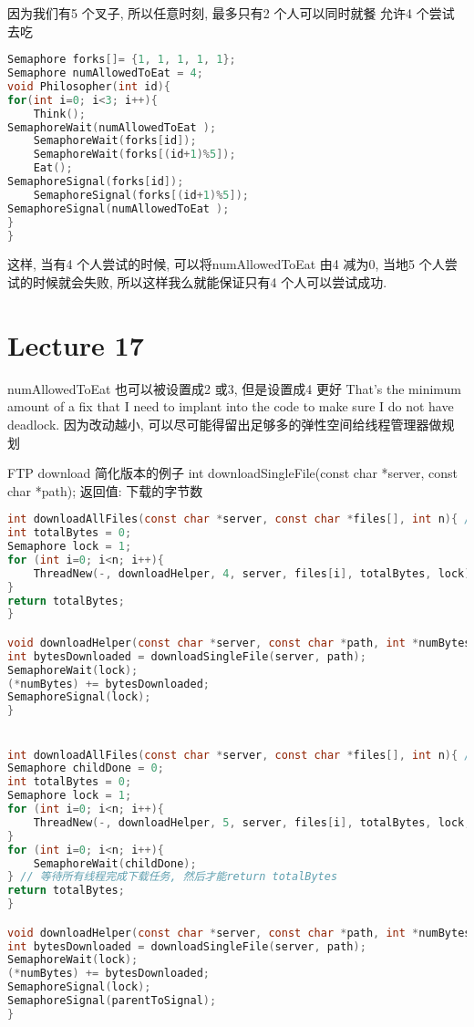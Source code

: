 \documentclass{article}
\begin{document}
因为我们有5 个叉子, 所以任意时刻, 最多只有2 个人可以同时就餐
允许4 个尝试去吃
\begin{lstlisting}[language = C]
Semaphore forks[]= {1, 1, 1, 1, 1};
Semaphore numAllowedToEat = 4;
void Philosopher(int id){
for(int i=0; i<3; i++){
	Think();
SemaphoreWait(numAllowedToEat );
	SemaphoreWait(forks[id]);
	SemaphoreWait(forks[(id+1)%5]);
	Eat();
SemaphoreSignal(forks[id]);
	SemaphoreSignal(forks[(id+1)%5]);
SemaphoreSignal(numAllowedToEat );
}
}
\end{lstlisting}
这样, 当有4 个人尝试的时候, 可以将numAllowedToEat 由4 减为0, 当地5 个人尝试的时候就会失败, 所以这样我么就能保证只有4 个人可以尝试成功.

\section{Lecture 17}
numAllowedToEat 也可以被设置成2 或3, 但是设置成4 更好
That's the minimum amount of a fix that I need to implant into the code to make sure I do not have deadlock.
因为改动越小, 可以尽可能得留出足够多的弹性空间给线程管理器做规划

FTP download
简化版本的例子
int downloadSingleFile(const char *server, const char *path);
返回值: 下载的字节数

\begin{lstlisting}[language = C]
int downloadAllFiles(const char *server, const char *files[], int n){ // n files
int totalBytes = 0;
Semaphore lock = 1;
for (int i=0; i<n; i++){
	ThreadNew(-, downloadHelper, 4, server, files[i], totalBytes, lock);
}
return totalBytes;
}

void downloadHelper(const char *server, const char *path, int *numBytes, Semaphore lock){
int bytesDownloaded = downloadSingleFile(server, path);
SemaphoreWait(lock);
(*numBytes) += bytesDownloaded;
SemaphoreSignal(lock);
}


int downloadAllFiles(const char *server, const char *files[], int n){ // n files
Semaphore childDone = 0;
int totalBytes = 0;
Semaphore lock = 1;
for (int i=0; i<n; i++){
	ThreadNew(-, downloadHelper, 5, server, files[i], totalBytes, lock, childDone);
}
for (int i=0; i<n; i++){
	SemaphoreWait(childDone);
} // 等待所有线程完成下载任务, 然后才能return totalBytes
return totalBytes;
}

void downloadHelper(const char *server, const char *path, int *numBytes, Semaphore lock, Semaphore parentToSignal){
int bytesDownloaded = downloadSingleFile(server, path);
SemaphoreWait(lock);
(*numBytes) += bytesDownloaded;
SemaphoreSignal(lock);
SemaphoreSignal(parentToSignal);
}
\end{lstlisting}
\end{document}

